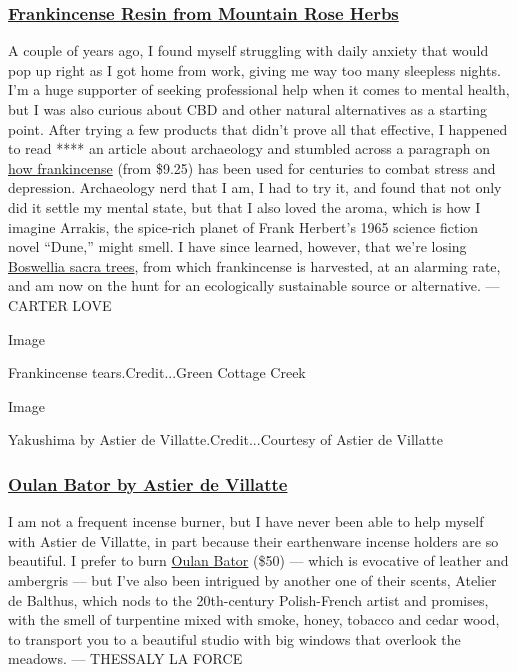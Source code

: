 \hypertarget{frankincense-resin-from-mountain-rose-herbs}{%
\subsubsection{\texorpdfstring{\textbf{\href{https://www.mountainroseherbs.com/products/frankincense-resin/profile}{Frankincense
Resin from Mountain Rose
Herbs}}}{Frankincense Resin from Mountain Rose Herbs}}\label{frankincense-resin-from-mountain-rose-herbs}}

A couple of years ago, I found myself struggling with daily anxiety that
would pop up right as I got home from work, giving me way too many
sleepless nights. I'm a huge supporter of seeking professional help when
it comes to mental health, but I was also curious about CBD and other
natural alternatives as a starting point. After trying a few products
that didn't prove all that effective, I happened to read **** an article
about archaeology and stumbled across a paragraph on
\href{https://www.mountainroseherbs.com/products/frankincense-resin/profile}{how
frankincense} (from \$9.25) has been used for centuries to combat stress
and depression. Archaeology nerd that I am, I had to try it, and found
that not only did it settle my mental state, but that I also loved the
aroma, which is how I imagine Arrakis, the spice-rich planet of Frank
Herbert's 1965 science fiction novel ``Dune,'' might smell. I have since
learned, however, that we're losing
\href{https://www.nytimes3xbfgragh.onion/2019/07/05/science/frankincense-trees-collapse.html}{Boswellia
sacra trees}, from which frankincense is harvested, at an alarming rate,
and am now on the hunt for an ecologically sustainable source or
alternative. --- CARTER LOVE

Image

Frankincense tears.Credit...Green Cottage Creek

Image

Yakushima by Astier de Villatte.Credit...Courtesy of Astier de Villatte

\hypertarget{oulan-bator-by-astier-de-villatte}{%
\subsubsection{\texorpdfstring{\textbf{\href{https://www.johnderian.com/products/oulan-bator-incense}{Oulan
Bator by Astier de
Villatte}}}{Oulan Bator by Astier de Villatte}}\label{oulan-bator-by-astier-de-villatte}}

I am not a frequent incense burner, but I have never been able to help
myself with Astier de Villatte, in part because their earthenware
incense holders are so beautiful. I prefer to burn
\href{https://www.johnderian.com/products/oulan-bator-incense}{Oulan
Bator} (\$50) --- which is evocative of leather and ambergris --- but
I've also been intrigued by another one of their scents, Atelier de
Balthus, which nods to the 20th-century Polish-French artist and
promises, with the smell of turpentine mixed with smoke, honey, tobacco
and cedar wood, to transport you to a beautiful studio with big windows
that overlook the meadows. --- THESSALY LA FORCE

